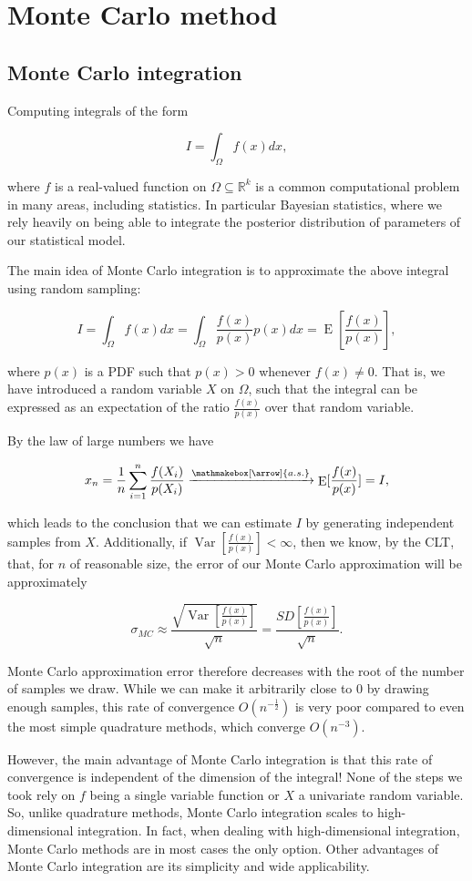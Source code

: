 \documentclass{book}
\theoremstyle{plain}%
\theoremstyle{definition}
\DeclareMathOperator{\Var}{Var}
\DeclareMathOperator{\E}{E}
\newlength{\arrow}
\newcommand*{\myrightarrow}[1]{\xrightarrow{\mathmakebox[\arrow]{#1}}}
\begin{document}
\chapter{Monte Carlo method}

\section{Monte Carlo integration}

Computing integrals of the form

$$I = \int_\Omega f(x) dx,$$

where $f$ is a real-valued function on $\Omega \subseteq \mathbb{R}^k$ is a common computational problem in many areas, including statistics. In particular Bayesian statistics, where we rely heavily on being able to integrate the posterior distribution of parameters of our statistical model.

The main idea of Monte Carlo integration is to approximate the above integral using random sampling:

$$I = \int_\Omega f(x) dx = \int_\Omega \frac{f(x)}{p(x)} p(x)dx = \E[\frac{f(x)}{p(x)}],$$

where $p(x)$ is a PDF such that $p(x) > 0$ whenever $f(x) \neq 0$. That is, we have introduced a random variable $X$ on $\Omega$, such that the integral can be expressed as an expectation of the ratio $\frac{f(x)}{p(x)}$ over that random variable.

By the law of large numbers we have

$$x_n = \frac{1}{n} \sum_{i=1}^n \frac{f(X_i)}{p(X_i)} \myrightarrow{a.s.} \E[\frac{f(x)}{p(x)}] = I,$$

which leads to the conclusion that we can estimate $I$ by generating independent samples from $X$. Additionally, if $\Var[\frac{f(x)}{p(x)}] < \infty$, then we know, by the CLT, that, for $n$ of reasonable size, the error of our Monte Carlo approximation will be approximately

$$\sigma_{MC} \approx \frac{\sqrt{\Var[\frac{f(x)}{p(x)}]}}{\sqrt{n}} = \frac{SD[\frac{f(x)}{p(x)}]}{\sqrt{n}} .$$

Monte Carlo approximation error therefore decreases with the root of the number of samples we draw. While we can make it arbitrarily close to 0 by drawing enough samples, this rate of convergence $O(n^{-\frac{1}{2}})$ is very poor compared to even the most simple quadrature methods, which converge $O(n^{-3})$.

However, the main advantage of Monte Carlo integration is that this rate of convergence is independent of the dimension of the integral! None of the steps we took rely on $f$ being a single variable function or $X$ a univariate random variable. So, unlike quadrature methods, Monte Carlo integration scales to high-dimensional integration. In fact, when dealing with high-dimensional integration, Monte Carlo methods are in most cases the only option. Other advantages of Monte Carlo integration are its simplicity and wide applicability.
\end{document}
